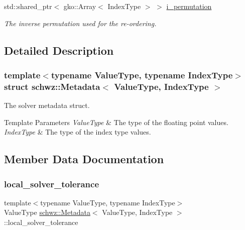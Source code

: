 \begin{DoxyCompactItemize}
\mbox{\label{structschwz_1_1Metadata_a9ede19ac4f54b4161bed0a39bf7f5767}} 
std\+::shared\+\_\+ptr$<$ gko\+::\+Array$<$ Index\+Type $>$ $>$ \hyperlink{structschwz_1_1Metadata_a9ede19ac4f54b4161bed0a39bf7f5767}{i\+\_\+permutation}
\begin{DoxyCompactList}\small\item\em The inverse permutation used for the re-\/ordering. \end{DoxyCompactList}\end{DoxyCompactItemize}


\subsection{Detailed Description}
\subsubsection*{template$<$typename Value\+Type, typename Index\+Type$>$\newline
struct schwz\+::\+Metadata$<$ Value\+Type, Index\+Type $>$}

The solver metadata struct. 


\begin{DoxyTemplParams}{Template Parameters}
{\em Value\+Type} & The type of the floating point values. \\
\hline
{\em Index\+Type} & The type of the index type values. \\
\hline
\end{DoxyTemplParams}


\subsection{Member Data Documentation}
\mbox{\label{structschwz_1_1Metadata_a0fec5924fa99f07cabf560cc461887b5}} 
\subsubsection{\texorpdfstring{local\+\_\+solver\+\_\+tolerance}{local\_solver\_tolerance}}
{\footnotesize\ttfamily template$<$typename Value\+Type, typename Index\+Type$>$ \\
Value\+Type \hyperlink{structschwz_1_1Metadata}{schwz\+::\+Metadata}$<$ Value\+Type, Index\+Type $>$\+::local\+\_\+solver\+\_\+tolerance}



